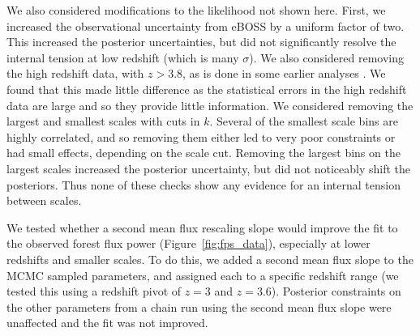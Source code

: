 We also considered modifications to the likelihood not shown here.
First, we increased the observational uncertainty from eBOSS by a uniform factor of two.
This increased the posterior uncertainties, but did not significantly resolve the internal tension at low redshift (which is many $\sigma$).
We also considered removing the high redshift data, with $z > 3.8$, as is done in some earlier analyses \cite{2011MNRAS.413.1717B}.
We found that this made little difference as the statistical errors in the high redshift data are large and so they provide little information. 
We considered removing the largest and smallest scales with cuts in $k$.
Several of the smallest scale bins are highly correlated, and so removing them either led to very poor constraints or had small effects, depending on the scale cut.
Removing the largest bins on the largest scales increased the posterior uncertainty, but did not noticeably shift the posteriors.
Thus none of these checks show any evidence for an internal tension between scales.

We tested whether a second mean flux rescaling slope would improve the fit to the observed \lya forest flux power (Figure~\ref{fig:fps_data}), especially at lower redshifts and smaller scales.
To do this, we added a second mean flux slope to the MCMC sampled parameters, and assigned each to a specific redshift range (we tested this using a redshift pivot of $z=3$ and $z=3.6$).
Posterior constraints on the other parameters from a chain run using the second mean flux slope were unaffected and the fit was not improved.
